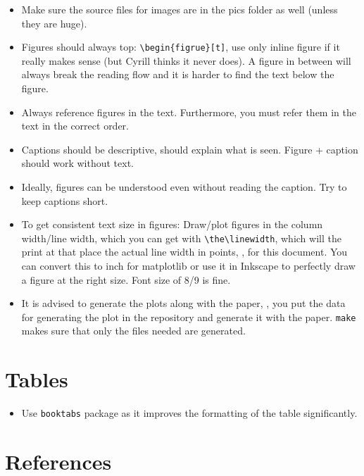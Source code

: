 \documentclass[a4paper, 10 pt, conference]{ieeeconf} %
\begin{document}
\begin{itemize}
  \item Make sure the source files for images are in the pics folder as well (unless they are huge).
  \item Figures should always top: \verb#\begin{figrue}[t]#, use only inline figure if it really makes sense (but Cyrill thinks it never does). A figure in between will always break the reading flow and it is harder to find the text below the figure.
  \item Always reference figures in the text. Furthermore, you must refer them in the text in the correct order.
  \item Captions should be descriptive, should explain what is seen. Figure + caption should work without text.
  \item Ideally, figures can be understood even without reading the caption. Try to keep captions short.
  \item To get consistent text size in figures: Draw/plot figures in the column width/line width, which you can get with \verb#\the\linewidth#, which will the print at that place the actual line width in points, \ie, \the\linewidth{} for this document. You can convert this to inch for matplotlib or use it in Inkscape to perfectly draw a figure at the right size. Font size of 8/9 is fine.
  \item It is advised to generate the plots along with the paper, \ie, you put the data for generating the plot in the repository and generate it with the paper. \verb#make# makes sure that only the files needed are generated.
\end{itemize}



\section{Tables}

\begin{itemize}
   \item Use \verb#booktabs# package as it improves the formatting of the table significantly.
\end{itemize}

\section{References}
\end{document}
